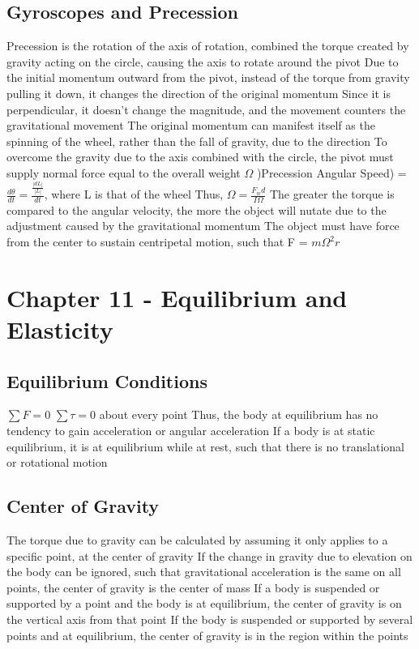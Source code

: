 \documentclass[11 pt, twoside]{article}
\newenvironment{outline*}
{
	\begin{outline}[enumerate]
	}
	{\end{outline}
}
\begin{document}
\subsection{Gyroscopes and Precession}
\begin{outline*}
\1 Precession is the rotation of the axis of rotation, combined the torque created by gravity acting on the circle, causing the axis to rotate around the pivot
\1 Due to the initial momentum outward from the pivot, instead of the torque from gravity pulling it down, it changes the direction of the original momentum
\2 Since it is perpendicular, it doesn’t change the magnitude, and the movement counters the gravitational movement
\2 The original momentum can manifest itself as the spinning of the wheel, rather than the fall of gravity, due to the direction
\2 To overcome the gravity due to the axis combined with the circle, the pivot must supply normal force equal to the overall weight
\1 $\Omega$ )Precession Angular Speed) = $\frac{d\theta}{dt} = \frac{\frac{|dL|}{|L|}}{dt}$, where L is that of the wheel
\2 Thus, $\Omega = \frac{F_wd}{I\Omega}$
\2 The greater the torque is compared to the angular velocity, the more the object will nutate due to the adjustment caused by the gravitational momentum
\2 The object must have force from the center to sustain centripetal motion, such that F = $m\Omega^2r$
\end{outline*}
\section{Chapter 11 - Equilibrium and Elasticity}
\subsection{Equilibrium Conditions}
\begin{outline*}
\1 $\sum F = 0$
\1 $\sum \tau = 0$ about every point
\1 Thus, the body at equilibrium has no tendency to gain acceleration or angular acceleration
\1 If a body is at static equilibrium, it is at equilibrium while at rest, such that there is no translational or rotational motion
\end{outline*}
\subsection{Center of Gravity}
\begin{outline*}
\1 The torque due to gravity can be calculated by assuming it only applies to a specific point, at the center of gravity
\1 If the change in gravity due to elevation on the body can be ignored, such that gravitational acceleration is the same on all points, the center of gravity is the center of mass
\1 If a body is suspended or supported by a point and the body is at equilibrium, the center of gravity is on the vertical axis from that point
\2 If the body is suspended or supported by several points and at equilibrium, the center of gravity is in the region within the points
\end{outline*}
\end{document}
